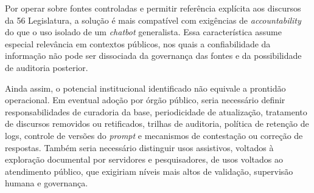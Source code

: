 Por operar sobre fontes controladas e permitir referência explícita aos discursos da 56\textordfeminine{} Legislatura, a solução é mais compatível com exigências de \textit{accountability} do que o uso isolado de um \textit{chatbot} generalista. Essa característica assume especial relevância em contextos públicos, nos quais a confiabilidade da informação não pode ser dissociada da governança das fontes e da possibilidade de auditoria posterior.

Ainda assim, o potencial institucional identificado não equivale a prontidão operacional. Em eventual adoção por órgão público, seria necessário definir responsabilidades de curadoria da base, periodicidade de atualização, tratamento de discursos removidos ou retificados, trilhas de auditoria, política de retenção de logs, controle de versões do \textit{prompt} e mecanismos de contestação ou correção de respostas. Também seria necessário distinguir usos assistivos, voltados à exploração documental por servidores e pesquisadores, de usos voltados ao atendimento público, que exigiriam níveis mais altos de validação, supervisão humana e governança.
